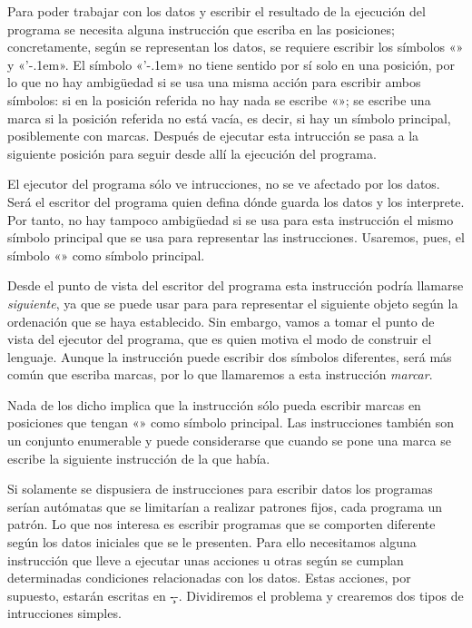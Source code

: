 %
Para poder trabajar con los datos y escribir el resultado de la ejecución del programa se necesita
alguna instrucción que escriba en las posiciones; concretamente, según se representan los datos, se
requiere escribir los símbolos «» y «{\fcodej’\kern-.1em}». El símbolo
«{\fcodej’\kern-.1em}» no tiene sentido por sí solo en una posición, por lo que no hay ambigüedad si
se usa una misma acción para escribir ambos símbolos: si en la posición referida no hay nada se
escribe «»; se escribe una marca si la posición referida no está vacía, es decir, si hay un
símbolo principal, posiblemente con marcas. Después de ejecutar esta intrucción se pasa a la
siguiente posición para seguir desde allí la ejecución del programa.

El ejecutor del programa sólo ve intrucciones, no se ve afectado por los datos. Será el escritor del
programa quien defina dónde guarda los datos y los interprete. Por tanto, no hay tampoco ambigüedad
si se usa para esta instrucción el mismo símbolo principal que se usa para representar las
instrucciones. Usaremos, pues, el símbolo «» como símbolo principal.

Desde el punto de vista del escritor del programa esta instrucción podría llamarse {\it siguiente},
ya que se puede usar para para representar el siguiente objeto según la ordenación que se haya
establecido. Sin embargo, vamos a tomar el punto de vista del ejecutor del programa, que es quien
motiva el modo de construir el lenguaje. Aunque la instrucción puede escribir dos símbolos
diferentes, será más común que escriba marcas, por lo que llamaremos a esta instrucción {\it
marcar}.

Nada de los dicho implica que la instrucción sólo pueda escribir marcas en posiciones que tengan
«» como símbolo principal. Las instrucciones también son un conjunto enumerable y puede
considerarse que cuando se pone una marca se escribe la siguiente instrucción de la que había.

%
Si solamente se dispusiera de instrucciones para escribir datos los programas serían autómatas que
se limitarían a realizar patrones fijos, cada programa un patrón. Lo que nos interesa es escribir
programas que se comporten diferente según los datos iniciales que se le presenten. Para ello
necesitamos alguna instrucción que lleve a ejecutar unas acciones u otras según se cumplan
determinadas condiciones relacionadas con los datos. Estas acciones, por supuesto, estarán escritas
en \c--. Dividiremos el problema y crearemos dos tipos de intrucciones simples.

